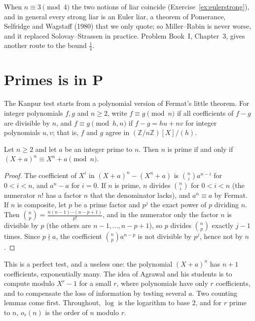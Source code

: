 When $n\equiv3\pmod4$ the two notions of liar coincide (Exercise~\ref{ex:eulerstrong}), and in general every strong liar is an Euler liar, a theorem of Pomerance, Selfridge and Wagstaff (1980) that we only quote; so Miller--Rabin is never worse, and it replaced Solovay--Strassen in practice. Problem Book~I, Chapter~3, gives another route to the bound $\frac14$.

\section{Primes is in P}\label{sec:aks}

The Kanpur test starts from a polynomial version of Fermat's little theorem. For integer polynomials $f,g$ and $n\ge2$, write $f\equiv g\pmod n$ if all coefficients of $f-g$ are divisible by $n$, and $f\equiv g\pmod{h,n}$ if $f-g=hu+nv$ for integer polynomials $u,v$; that is, $f$ and $g$ agree in $(\mathbb Z/n\mathbb Z)[X]/(h)$.

\begin{lemma}\label{lem:aksidentity}
Let $n\ge2$ and let $a$ be an integer prime to $n$. Then $n$ is prime if and only if $(X+a)^n\equiv X^n+a\pmod n$.
\end{lemma}
\begin{proof}
The coefficient of $X^i$ in $(X+a)^n-(X^n+a)$ is $\binom ni a^{n-i}$ for $0<i<n$, and $a^n-a$ for $i=0$. If $n$ is prime, $n$ divides $\binom ni$ for $0<i<n$ (the numerator $n!$ has a factor $n$ that the denominator lacks), and $a^n\equiv a$ by Fermat. If $n$ is composite, let $p$ be a prime factor and $p^j$ the exact power of $p$ dividing $n$. Then
$\binom np=\frac{n(n-1)\cdots(n-p+1)}{p!}$, and in the numerator only the factor $n$ is divisible by $p$ (the others are $n-1,\dots,n-p+1$), so $p$ divides $\binom np$ exactly $j-1$ times. Since $p\nmid a$, the coefficient $\binom npa^{n-p}$ is not divisible by $p^j$, hence not by $n$.
\end{proof}

This is a perfect test, and a useless one: the polynomial $(X+a)^n$ has $n+1$ coefficients, exponentially many. The idea of Agrawal and his students is to compute modulo $X^r-1$ for a small $r$, where polynomials have only $r$ coefficients, and to compensate the loss of information by testing several $a$. Two counting lemmas come first. Throughout, $\log$ is the logarithm to base $2$,
and for $r$ prime to $n$, $o_r(n)$ is the order of $n$ modulo $r$.

